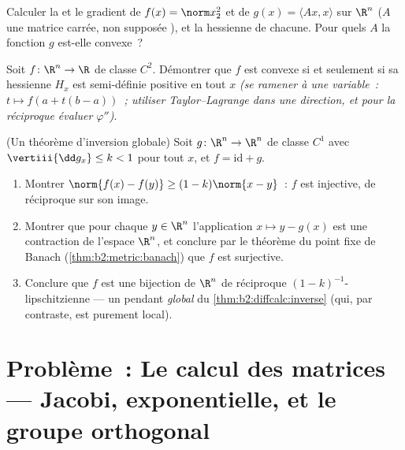 \begin{exercise}[$\star$]\label{exo:b2:diffcalc:10}
Calculer la  et le gradient de $f(x) = \norm
x_2^2$ et de $g(x) = \langle Ax, x\rangle$ sur $\R^n$ ($A$ une
matrice carrée, non supposée ), et la hessienne de chacune.
Pour quels $A$ la fonction $g$ est-elle convexe~?
\end{exercise}

\begin{exercise}[$\star\star$]\label{exo:b2:diffcalc:11}
Soit $f \colon \R^n \to \R$ de classe $C^2$. Démontrer que $f$ est
convexe si et seulement si sa hessienne $H_x$ est semi-définie
positive en tout $x$ \emph{(se ramener à une variable~: $t \mapsto
f(a + t(b-a))$~; utiliser Taylor--Lagrange dans une direction, et
pour la réciproque évaluer $\varphi''$)}.
\end{exercise}

\begin{exercise}[$\star\star\star$]\label{exo:b2:diffcalc:12}
(Un théorème d'inversion globale) Soit $g \colon \R^n \to \R^n$ de
classe $C^1$ avec $\vertiii{\dd g_x} \leq k < 1$ pour tout $x$, et $f =
\mathrm{id} + g$.
\begin{enumerate}
  \item Montrer $\norm{f(x) - f(y)} \geq (1 - k)\norm{x - y}$~: $f$
        est injective, de réciproque  sur son image.
  \item Montrer que pour chaque $y \in \R^n$ l'application $x \mapsto
        y - g(x)$ est une contraction de l'espace  $\R^n$,
        et conclure par le théorème du point fixe de Banach
        (\cref{thm:b2:metric:banach}) que $f$ est surjective.
  \item Conclure que $f$ est une bijection de $\R^n$ de réciproque
        $(1-k)^{-1}$-lipschitzienne --- un pendant \emph{global} du
        \cref{thm:b2:diffcalc:inverse} (qui, par contraste, est
        purement local).
\end{enumerate}
\end{exercise}

\section{Problème~: Le calcul des matrices --- Jacobi,
exponentielle, et le groupe orthogonal}

